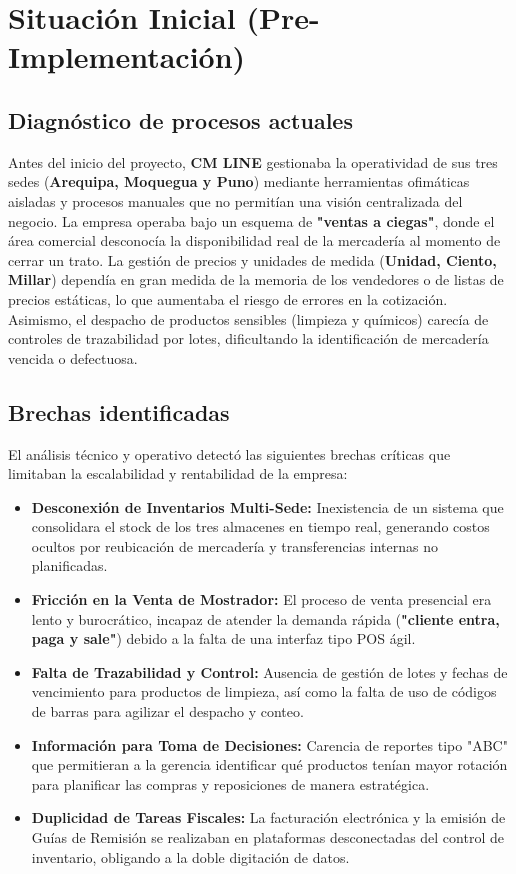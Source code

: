 \section{Situación Inicial (Pre-Implementación)}

\subsection{Diagnóstico de procesos actuales}
Antes del inicio del proyecto, \textbf{CM LINE} gestionaba la operatividad de sus tres sedes (\textbf{Arequipa, Moquegua y Puno}) mediante herramientas ofimáticas aisladas y procesos manuales que no permitían una visión centralizada del negocio. La empresa operaba bajo un esquema de \textbf{"ventas a ciegas"}, donde el área comercial desconocía la disponibilidad real de la mercadería al momento de cerrar un trato. La gestión de precios y unidades de medida (\textbf{Unidad, Ciento, Millar}) dependía en gran medida de la memoria de los vendedores o de listas de precios estáticas, lo que aumentaba el riesgo de errores en la cotización. Asimismo, el despacho de productos sensibles (limpieza y químicos) carecía de controles de trazabilidad por lotes, dificultando la identificación de mercadería vencida o defectuosa.

\subsection{Brechas identificadas}
El análisis técnico y operativo detectó las siguientes brechas críticas que limitaban la escalabilidad y rentabilidad de la empresa:

\begin{itemize}
    \item \textbf{Desconexión de Inventarios Multi-Sede:} Inexistencia de un sistema que consolidara el stock de los tres almacenes en tiempo real, generando costos ocultos por reubicación de mercadería y transferencias internas no planificadas.
    \item \textbf{Fricción en la Venta de Mostrador:} El proceso de venta presencial era lento y burocrático, incapaz de atender la demanda rápida (\textbf{"cliente entra, paga y sale"}) debido a la falta de una interfaz tipo POS ágil.
    \item \textbf{Falta de Trazabilidad y Control:} Ausencia de gestión de lotes y fechas de vencimiento para productos de limpieza, así como la falta de uso de códigos de barras para agilizar el despacho y conteo.
    \item \textbf{Información para Toma de Decisiones:} Carencia de reportes tipo "ABC" que permitieran a la gerencia identificar qué productos tenían mayor rotación para planificar las compras y reposiciones de manera estratégica.
    \item \textbf{Duplicidad de Tareas Fiscales:} La facturación electrónica y la emisión de Guías de Remisión se realizaban en plataformas desconectadas del control de inventario, obligando a la doble digitación de datos.
\end{itemize}

